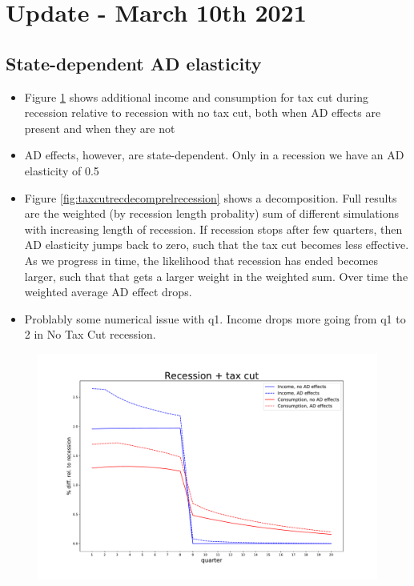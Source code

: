 \documentclass[]{article}
\begin{document}
\section{Update - March 10th 2021}	

\FloatBarrier
\subsection{State-dependent AD elasticity}

\begin{itemize}
	\item Figure \ref{fig:recessiontaxcutrelrecession_statedep} shows additional income and consumption for tax cut during recession relative to recession with no tax cut, both when AD effects are present and when they are not
	\item AD effects, however, are state-dependent. Only in a recession we have an AD elasticity of 0.5
	\item Figure \ref{fig:taxcutrecdecomprelrecession} shows a decomposition. Full results are the weighted (by recession length probality) sum of different simulations with increasing length of recession. If recession stops after few quarters, then AD elasticity jumps back to zero, such that the tax cut becomes less effective. As we progress in time, the likelihood that recession has ended becomes larger, such that that gets a larger weight in the weighted sum. Over time the weighted average AD effect drops.
	\item Problably some numerical issue with q1. Income drops more going from q1 to 2 in No Tax Cut recession.
\end{itemize}

\begin{figure}
	\centering
	\includegraphics[width=\linewidth]{../Full_Run_Mar5/recession_taxcut_relrecession}
	\caption{}
	\label{fig:recessiontaxcutrelrecession_statedep}
\end{figure}
\end{document}

